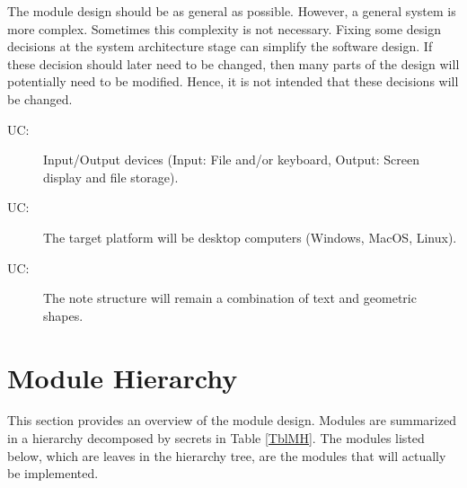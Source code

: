 \documentclass[12pt, titlepage]{article}
\newcounter{ucnum}
\newcommand{\uctheucnum}{UC\theucnum}
\begin{document}
The module design should be as general as possible. However, a general system is
more complex. Sometimes this complexity is not necessary. Fixing some design
decisions at the system architecture stage can simplify the software design. If
these decision should later need to be changed, then many parts of the design
will potentially need to be modified. Hence, it is not intended that these
decisions will be changed.

\begin{description}
\item[ \uctheucnum \label{ucIO}:] Input/Output devices
  (Input: File and/or keyboard, Output: Screen display and file storage).
\item [ \uctheucnum \label{ucPlatform}:] The target platform
  will be desktop computers (Windows, MacOS, Linux).
\item [ \uctheucnum \label{ucStructure}:] The note structure
  will remain a combination of text and geometric shapes.
\end{description}

\section{Module Hierarchy} \label{SecMH}

This section provides an overview of the module design. Modules are summarized
in a hierarchy decomposed by secrets in Table \ref{TblMH}. The modules listed
below, which are leaves in the hierarchy tree, are the modules that will
actually be implemented.
\end{document}
